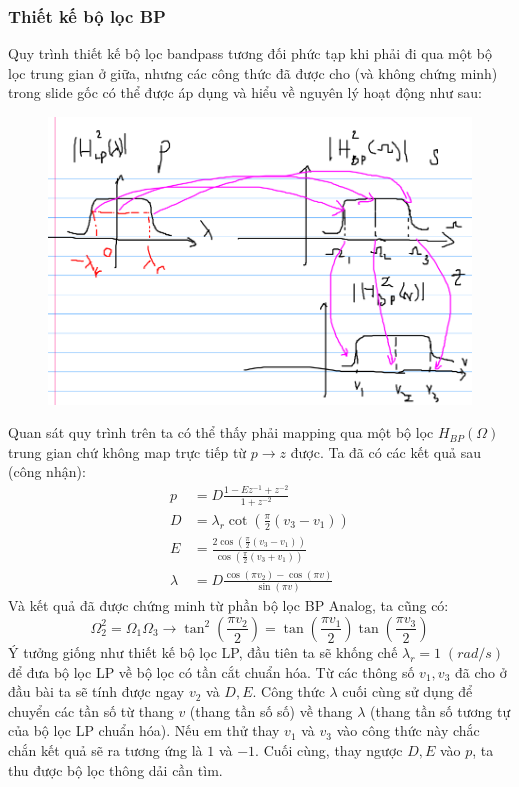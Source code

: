 \documentclass{article}
\begin{document}
\subsubsection{Thiết kế bộ lọc BP}
Quy trình thiết kế bộ lọc bandpass tương đối phức tạp khi phải đi qua một bộ lọc trung gian ở giữa, nhưng các công thức đã được cho (và không chứng minh) trong slide gốc
có thể được áp dụng và hiểu về nguyên lý hoạt động như sau:
\begin{figure}[H]
  \begin{center}
  \includegraphics[width=13cm]{16.png}
  \end{center}
  \end{figure}
Quan sát quy trình trên ta có thể thấy phải mapping qua một bộ lọc $H_{BP}(\Omega)$ trung gian chứ không map trực tiếp từ $p\to z$ được. Ta đã có các kết quả sau (công nhận):
\begin{equation*}
  \begin{split}
  p&=D\frac{1-Ez^{-1}+z^{-2}}{1+z^{-2}}\\
  D&=\lambda_{r}\cot{\left(\frac{\pi}{2}(v_{3}-v_{1})\right)}\\
  E&=\frac{2\cos{\left(\frac{\pi}{2}(v_{3}-v_{1})\right)}}{\cos{\left(\frac{\pi}{2}(v_{3}+v_{1})\right)}}\\
  \lambda&=D\frac{\cos{(\pi v_{2})}-\cos{(\pi v)}}{\sin{(\pi v)}}
  \end{split}
\end{equation*}
Và kết quả đã được chứng minh từ phần bộ lọc BP Analog, ta cũng có:
$$\Omega_{2}^2=\Omega_{1}\Omega_{3}\to \tan^2{\left(\frac{\pi v_{2}}{2}\right)}=\tan{\left(\frac{\pi v_{1}}{2}\right)}\tan{\left(\frac{\pi v_{3}}{2}\right)}$$
Ý tưởng giống như thiết kế bộ lọc LP, đầu tiên ta sẽ khống chế $\lambda_{r}=1 \; (rad/s)$ để đưa bộ lọc LP về bộ lọc có tần cắt chuẩn hóa. Từ các thông số $v_{1}, v_{3}$
đã cho ở đầu bài ta sẽ tính được ngay $v_{2}$ và $D, E$. Công thức $\lambda$ cuối cùng sử dụng để chuyển các tần số từ thang $v$ (thang tần số số) về thang $\lambda$ (thang tần số tương tự của bộ lọc LP chuẩn hóa). Nếu em thử thay $v_{1}$ và $v_{3}$ vào công thức
này chắc chắn kết quả sẽ ra tương ứng là $1$ và $-1$. Cuối cùng, thay ngược $D, E$ vào $p$, ta thu được bộ lọc thông dải cần tìm.
\end{document}
